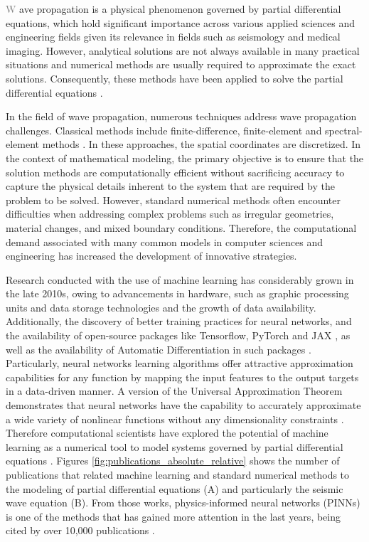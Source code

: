\documentclass[11pt,twoside]{article}
\begin{document}
\lettrine{\textcolor{gray}{W}}{ }ave propagation is a physical phenomenon governed by partial differential equations, 
which hold significant importance across various applied sciences and engineering fields given its relevance in fields 
such as seismology and medical imaging. However, analytical solutions are not always available in many practical 
situations and numerical methods are usually required to approximate the exact solutions. Consequently, these methods 
have been applied to solve the partial differential equations \citep{Seriani2020}.

In the field of wave propagation, numerous techniques address wave propagation challenges. Classical methods include 
finite-difference, finite-element and spectral-element methods \citep{Moczo, virieux_review_2011, Igel2017,
komatitsch_introduction_1999,chaljub_spectral-element_2007}. In these approaches, the spatial coordinates are discretized. 
In the context of mathematical modeling, the primary objective is to ensure that the solution methods 
are computationally efficient without sacrificing accuracy to capture the physical details inherent to the 
system that are required by the problem to be solved. However, standard numerical methods often encounter 
difficulties when addressing complex problems such as irregular geometries, material changes, and mixed boundary 
conditions. Therefore, the computational demand associated with many common models in computer sciences and engineering 
has increased the development of innovative strategies.

Research conducted with the use of machine learning has considerably grown in the late 2010s, owing to advancements 
in hardware, such as graphic processing units and data storage technologies and the growth of data availability. 
Additionally, the discovery of better training practices for neural networks, and the availability of open-source 
packages like Tensorflow, PyTorch and JAX \citep{abadi_tensorflow_2016,paszke_pytorch_2019,jax2018github}, as well 
as the availability of Automatic Differentiation in such packages \citep{paszke_automatic_2017,baydin_automatic_2017}. 
Particularly, neural networks learning algorithms offer attractive approximation capabilities for any function by 
mapping the input features to the output targets in a data-driven manner. A version of the Universal Approximation 
Theorem demonstrates that neural networks have the capability to accurately approximate a wide 
variety of nonlinear functions without any dimensionality constraints \citep{barron_universal_1993}. Therefore 
computational scientists have explored the potential of machine learning as a numerical tool to model systems governed 
by partial differential equations \citep{cuomo_scientific_2022,karniadakis_physics-informed_2021}. Figures 
\ref{fig:publications_absolute_relative} shows the number of publications that related machine 
learning and standard numerical methods to the modeling of partial differential equations (A) and particularly
the seismic wave equation (B). From those works, physics-informed neural networks (PINNs) is one of the methods that 
has gained more attention in the last years, being cited by over 10,000 publications \citep{Raissi2019}.
\end{document}

